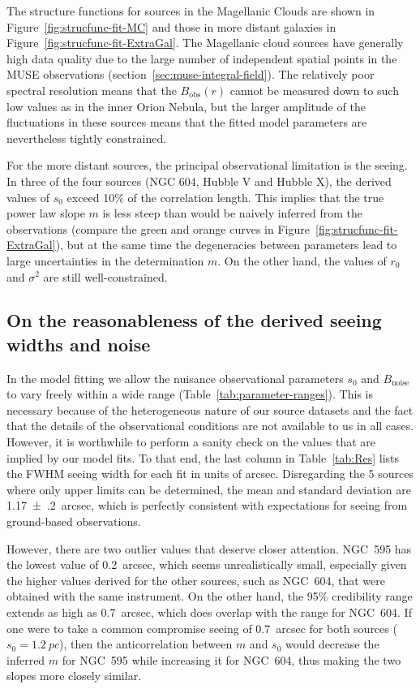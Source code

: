 \documentclass[fleqn,usenatbib, useAMS, a4paper]{mnras}
\newcommand\noise{\ensuremath{_{\text{noise}}}}
\newcommand\obs{\ensuremath{_{\mathrm{obs}}}}
\begin{document}
The structure functions for sources in the Magellanic Clouds are shown in Figure~\ref{fig:strucfunc-fit-MC}
and those in more distant galaxies in Figure~\ref{fig:strucfunc-fit-ExtraGal}.
The Magellanic cloud sources have generally high data quality due to the
large number of independent spatial points in the MUSE observations
(section~\ref{sec:muse-integral-field}).
The relatively poor spectral resolution means that the \(B\obs(r)\) cannot
be measured down to such low values as in the inner Orion Nebula,
but the larger amplitude of the fluctuations in these sources means
that the fitted model parameters are nevertheless tightly constrained.

For the more distant sources, the principal observational limitation is the seeing.
In three of the four sources (NGC 604, Hubble V and Hubble X),
the derived values of \(s_0\) exceed 10\% of the correlation length.
This implies that the true power law slope \(m\) is less steep than
would be naively inferred from the observations
(compare the green and orange curves in Figure~\ref{fig:strucfunc-fit-ExtraGal}),
but at the same time the degeneracies between parameters
lead to large uncertainties in the determination \(m\).
On the other hand, the values of \(r_0\) and \(\sigma^2\) are still well-constrained.

\subsection{On the reasonableness of the derived seeing widths and noise}
\label{sec:sanity-check-derived}
In the model fitting we allow the nuisance observational parameters
\(s_0\) and \(B\noise\) to vary freely within a wide range
(Table~\ref{tab:parameter-ranges}).
This is necessary because of the heterogeneous nature of our source datasets
and the fact that the details of the observational conditions
are not available to us in all cases.
However, it is worthwhile to perform a sanity check on the values that are implied by our model fits.
To that end, the last column in Table~\ref{tab:Res} lists the FWHM seeing width for each fit in units of arcsec.
Disregarding the 5 sources where only upper limits can be determined,
the mean and standard deviation are \SI{1.17(20)}{arcsec},
which is perfectly consistent with expectations for seeing from ground-based observations.

However, there are two outlier values that deserve closer attention.
NGC~595 has the lowest value of \SI{0.2}{arcsec}, which seems
unrealistically small, especially given the higher values
derived for the other sources, such as NGC~604,
that were obtained with the same instrument.
On the other hand, the 95\% credibility range extends as high as \SI{0.7}{arcsec},
which does overlap with the range for NGC~604.
If one were to take a common compromise seeing of \SI{0.7}{arcsec}
for both sources (\(s_0 = \SI{1.2}{pc}\)),
then the anticorrelation between \(m\) and \(s_0\)
would decrease the inferred \(m\) for NGC~595 while increasing it for NGC~604,
thus making the two slopes more closely similar. 
\end{document}
